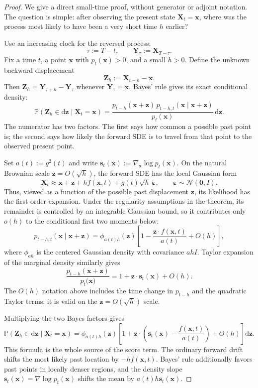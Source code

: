 \documentclass[11pt,a4paper]{article}
\theoremstyle{definition}
\begin{document}
\begin{proof}
We give a direct small-time proof, without generator or adjoint notation. The question is
simple: after observing the present state $\mathbf{X}_t=\mathbf{x}$, where was the process
most likely to have been a very short time $h$ earlier?

Use an increasing clock for the reversed process:
\[
\tau:=T-t,
\qquad
\mathbf{Y}_\tau:=\mathbf{X}_{T-\tau}.
\]
Fix a time $t$, a point $\mathbf{x}$ with $p_t(\mathbf{x})>0$, and a small $h>0$. Define
the unknown backward displacement
\[
\mathbf{Z}_h:=\mathbf{X}_{t-h}-\mathbf{x}.
\]
Then $\mathbf{Z}_h=\mathbf{Y}_{\tau+h}-\mathbf{Y}_\tau$ whenever
$\mathbf{Y}_\tau=\mathbf{x}$. Bayes' rule gives its exact conditional density:
\[
\mathbb{P}\!\left(
\mathbf{Z}_h\in\mathrm{d}\mathbf{z}
\mid\mathbf{X}_t=\mathbf{x}
\right)
=\frac{
p_{t-h}(\mathbf{x}+\mathbf{z})\,
p_{t-h,t}(\mathbf{x}\mid\mathbf{x}+\mathbf{z})}
{p_t(\mathbf{x})}\,\mathrm{d}\mathbf{z}.
\]
The numerator has two factors. The first says how common a possible past point is; the
second says how likely the forward SDE is to travel from that point to the observed present
point.

Set $a(t):=g^2(t)$ and write
$\mathbf{s}_t(\mathbf{x}):=\nabla_{\mathbf{x}}\log p_t(\mathbf{x})$. On the natural
Brownian scale $\mathbf{z}=O(\sqrt{h})$, the forward SDE has the local Gaussian form
\[
\mathbf{X}_t
\approx
\mathbf{x}+\mathbf{z}
+h f(\mathbf{x},t)
+g(t)\sqrt{h}\,\boldsymbol{\varepsilon},
\qquad
\boldsymbol{\varepsilon}\sim\mathcal{N}(\mathbf{0},I).
\]
Thus, viewed as a function of the possible past displacement $\mathbf{z}$, its likelihood
has the first-order expansion. Under the regularity assumptions in the theorem, its
remainder is controlled by an integrable Gaussian bound, so it contributes only $o(h)$ to
the conditional first two moments below:
\[
p_{t-h,t}(\mathbf{x}\mid\mathbf{x}+\mathbf{z})
=\phi_{a(t)h}(\mathbf{z})
\left[
1-\frac{\mathbf{z}\cdot f(\mathbf{x},t)}{a(t)}
+O(h)
\right],
\]
where $\phi_{a h}$ is the centered Gaussian density with covariance $ahI$. Taylor
expansion of the marginal density similarly gives
\[
\frac{p_{t-h}(\mathbf{x}+\mathbf{z})}{p_t(\mathbf{x)}
}
=1+\mathbf{z}\cdot\mathbf{s}_t(\mathbf{x})+O(h).
\]
The $O(h)$ notation above includes the time change in $p_{t-h}$ and the quadratic
Taylor terms; it is valid on the $\mathbf{z}=O(\sqrt{h})$ scale.

Multiplying the two Bayes factors gives
\[
\mathbb{P}\!\left(
\mathbf{Z}_h\in\mathrm{d}\mathbf{z}
\mid\mathbf{X}_t=\mathbf{x}
\right)
=\phi_{a(t)h}(\mathbf{z})
\left[
1+\mathbf{z}\cdot
\left(
\mathbf{s}_t(\mathbf{x})
-\frac{f(\mathbf{x},t)}{a(t)}
\right)
+O(h)
\right]\mathrm{d}\mathbf{z}.
\]
This formula is the whole source of the score term. The ordinary forward drift shifts the
most likely past location by $-h f(\mathbf{x},t)$. Bayes' rule additionally favors past
points in locally denser regions, and the density slope
$\mathbf{s}_t(\mathbf{x})=\nabla\log p_t(\mathbf{x})$ shifts the mean by
$a(t)h\mathbf{s}_t(\mathbf{x})$.


\end{proof}
\end{document}
